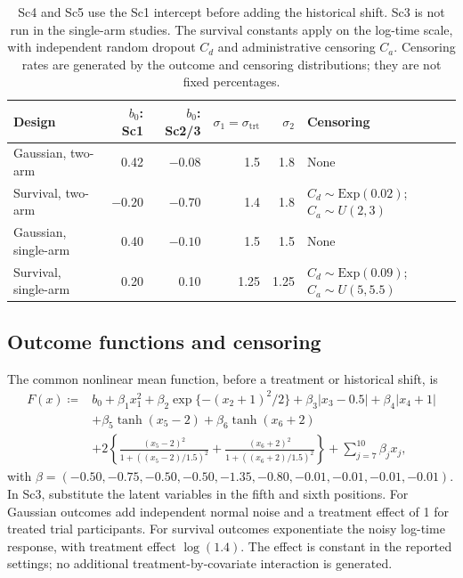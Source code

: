 \documentclass[11pt]{article}
\theoremstyle{remark}\newtheorem{remark}{Remark}[section]
\begin{document}
\begin{table}[htbp]
\centering\small
\caption{Design-specific data-generating constants.}\label{tab:S2}
\begin{tabular}{p{1.25in}rrrrp{1.1in}}
\toprule
Design & $b_0$: Sc1 & $b_0$: Sc2/3 & $\sigma_1=\sigma_{\mathrm{trt}}$ & $\sigma_2$ & Censoring\\\midrule
Gaussian, two-arm & 0.42 & $-0.08$ & 1.5 & 1.8 & None\\
Survival, two-arm & $-0.20$ & $-0.70$ & 1.4 & 1.8 & $C_d\sim\mathrm{Exp}(0.02)$; $C_a\sim U(2,3)$\\
Gaussian, single-arm & 0.40 & $-0.10$ & 1.5 & 1.5 & None\\
Survival, single-arm & 0.20 & 0.10 & 1.25 & 1.25 & $C_d\sim\mathrm{Exp}(0.09)$; $C_a\sim U(5,5.5)$\\
\bottomrule
\end{tabular}
\caption*{Sc4 and Sc5 use the Sc1 intercept before adding the historical shift. Sc3 is not run in the single-arm studies. The survival constants apply on the log-time scale, with independent random dropout $C_d$ and administrative censoring $C_a$. Censoring rates are generated by the outcome and censoring distributions; they are not fixed percentages.}
\end{table}

\subsection{Outcome functions and censoring}\label{sec:E.2}
The common nonlinear mean function, before a treatment or historical shift, is
\begin{equation}\label{eq:dgp}
\begin{aligned}
F(x)\coloneqq {}&b_0+\beta_1x_1^2+\beta_2\exp\{-(x_2+1)^2/2\}
+\beta_3|x_3-0.5|+\beta_4|x_4+1|\\
&+\beta_5\tanh(x_5-2)+\beta_6\tanh(x_6+2)\\
&+2\left\{\frac{(x_5-2)^2}{1+((x_5-2)/1.5)^2}
+\frac{(x_6+2)^2}{1+((x_6+2)/1.5)^2}\right\}
+\sum_{j=7}^{10}\beta_jx_j,
\end{aligned}
\end{equation}
with $\beta=(-0.50,-0.75,-0.50,-0.50,-1.35,-0.80,-0.01,-0.01,-0.01,-0.01)$. In Sc3, substitute the latent variables in the fifth and sixth positions. For Gaussian outcomes add independent normal noise and a treatment effect of 1 for treated trial participants. For survival outcomes exponentiate the noisy log-time response, with treatment effect $\log(1.4)$. The effect is constant in the reported settings; no additional treatment-by-covariate interaction is generated.
\end{document}
